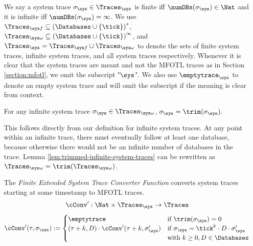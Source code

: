 We say a system trace $\sigma_\sys \in \Traces_\sys$
is finite iff $\numDBs(\sigma_\sys) \in \Nat$
and it is infinite iff $\numDBs(\sigma_\sys) = \infty$.
We use
$\Traces_{\sys f} \subseteq 
\left( \Databases \cup \left\{\tick \right\} \right)^*$,
$\Traces_{\sys \omega} \subseteq
\left( \Databases \cup \left\{\tick \right\} \right)^\infty$,
and
$\Traces_\sys = 
\Traces_{\sys f} \cup \Traces_{\sys \omega}$
to denote the sets of finite system traces, infinite system traces,
and all system traces respectively.
Whenever it is clear that the system traces are meant and not the
MFOTL traces as in Section \ref{section:mfotl}, we omit the
subscript "$\sys$".
We also use $\emptytrace_\sys$ to denote an empty system
trace and will omit the subscript if the meaning is clear from
context.

\begin{lemma}
    \label{lem:trimmed-infinite-system-traces}
    For any infinite system trace $\sigma_\sys \in \Traces_{\sys \omega}$,
    $\sigma_\sys = \trim(\sigma_\sys).$
\end{lemma}
This follows directly from our definition for infinite system traces.
At any point within an infinite trace, there must eventually follow
at least one database, because otherwise there would not
be an infinite number of databases in the trace.
Lemma \ref{lem:trimmed-infinite-system-traces} can be rewritten as
$\Traces_{\sys \omega} = \trim(\Traces_{\sys \omega})$.

\begin{definition}
    \label{def:cconv'}
    The \emph{Finite Extended System Trace Converter Function} converts system
    traces starting at some timestamp to MFOTL traces.
    \begin{align*}
        \cConv':
        \Nat \times \Traces_\sys
        \to \Traces
    \end{align*}
    \begin{align*}
        \cConv'(\tau, \sigma_\sys) :=
        \begin{cases}
            \emptytrace
                & \text{if } \trim(\sigma_\sys) = 0 \\
            (\tau + k, D) \cdot \cConv'(\tau+k, \sigma'_\sys)
                & \text{if } \sigma_\sys = \tick^k \cdot D \cdot \sigma'_\sys \\
                & \text{with } k \geq 0, D \in \Databases \\
        \end{cases}
    \end{align*}
\end{definition}

